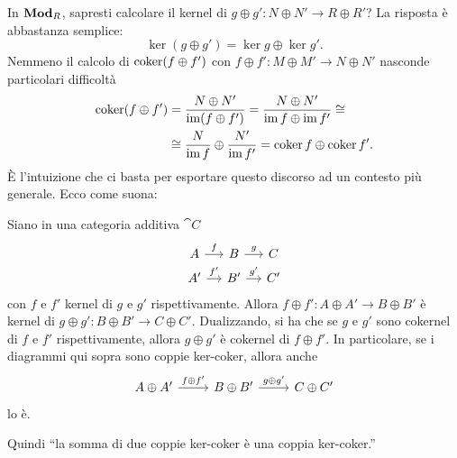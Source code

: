 In \(\mathbf{Mod}_R\), sapresti calcolare il kernel di
\(g \oplus g' : N \oplus N' \to R \oplus R'\)? La risposta è abbastanza
semplice:
\[
  \ker (g \oplus g') = \ker g \oplus \ker g' .
\]
Nemmeno il calcolo di \(\operatorname{coker}(f \oplus f')\) con
\(f \oplus f' : M \oplus M' \to N \oplus N'\) nasconde particolari
difficoltà
\begin{align*}
  \operatorname{coker} (f \oplus f') &= \frac{N \oplus N'}{\operatorname{im} (f \oplus f')} = \frac{N \oplus N'}{\operatorname{im} f \oplus
                         \operatorname{im} f'} \cong \\
                       &\cong\frac{N}{\operatorname{im} f} \oplus \frac{N'}{\operatorname{im} f'} = \operatorname{coker} f \oplus \operatorname{coker} f' . 
\end{align*}
È l'intuizione che ci basta per esportare questo discorso ad un contesto
più generale. Ecco come suona:

\begin{lemma}\label{lemma:KerCokerOplus}
  Siano in una categoria additiva \(\cat C\)
  \[
    \begin{tikzcd}[row sep=tiny, column sep=small]
      A \ar["{f}", r] & B \ar["{g}", r] & C \\
      A' \ar["{f'}", r] & B' \ar["{g'}", r] & C'
    \end{tikzcd}
  \]
  con \(f\) e \(f'\) kernel di \(g\) e \(g'\) rispettivamente.  Allora
  \(f \oplus f' : A \oplus A' \to B \oplus B'\) è kernel di
  \(g \oplus g' : B \oplus B' \to C \oplus C'\). Dualizzando, si ha che se
  \(g\) e \(g'\) sono cokernel di \(f\) e \(f'\) rispettivamente, allora
  \(g \oplus g'\) è cokernel di \(f \oplus f'\). In particolare, se i
  diagrammi qui sopra sono coppie ker-coker, allora anche
  \[
    \begin{tikzcd}
      A \oplus A' \ar["{f \oplus f'}", r] & B \oplus B' \ar["{g \oplus
        g'}", r] & C \oplus C'
    \end{tikzcd}
  \]
  lo è.
\end{lemma}

Quindi ``la somma di due coppie ker-coker è una coppia ker-coker.''


